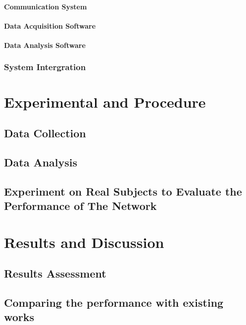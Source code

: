 \documentclass[letterpaper,12pt,titlepage,oneside,final]{book}
\begin{document}
\subsubsection{Communication System}

\subsubsection{Data Acquisition Software}

\subsubsection{Data Analysis Software}

\subsection{System Intergration}

\chapter{Experimental and Procedure}

\section{Data Collection}

\section{Data Analysis}

\section{Experiment on Real Subjects to Evaluate the Performance of The Network}

\chapter{Results and Discussion}

\section{Results Assessment}

\section{Comparing the performance with existing works}
\end{document}

